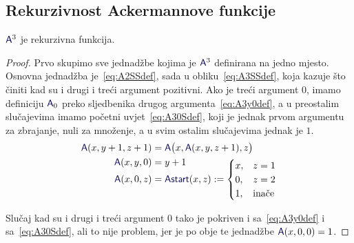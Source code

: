 \subsection{Rekurzivnost Ackermannove funkcije}

\begin{propozicija}[{name=[rekurzivnost Ackermannove funkcije]}]
    $\f A^3$ je rekurzivna funkcija.
\end{propozicija}
\begin{proof}
Prvo skupimo sve jednadžbe kojima je $\f A^3$ definirana na jedno mjesto. Osnovna jednadžba je~\eqref{eq:A2SSdef}, sada u obliku~\eqref{eq:A3SSdef}, koja kazuje što činiti kad su i drugi i treći argument pozitivni. Ako je treći argument $0$, imamo definiciju $\f A_0$ preko sljedbenika drugog argumenta~\eqref{eq:A3y0def}, a u preostalim slučajevima imamo početni uvjet~\eqref{eq:A30Sdef}, koji je jednak prvom argumentu za zbrajanje, nuli za množenje, a u svim ostalim slučajevima jednak je $1$.
\begin{align}
\label{eq:A3SSdef}
    \f A(x,y+1,z+1)&=\f A\bigl(x,\f A(x,y,z+1),z\bigr)\\
\label{eq:A3y0def}
    \f A(x,y,0)&=y+1\\[-5mm]
\label{eq:A30Sdef}
    \f A(x,0,z)&=\f{Astart}(x,z):=\begin{cases}
        x,&z=1\\
        0,&z=2\\
        1,&\text{inače}
    \end{cases}
\end{align}

Slučaj kad su i drugi i treći argument $0$ tako je pokriven i sa~\eqref{eq:A3y0def} i sa~\eqref{eq:A30Sdef}, ali to nije problem, jer je po obje te jednadžbe $\f A(x,0,0)=1$.


\end{proof}
